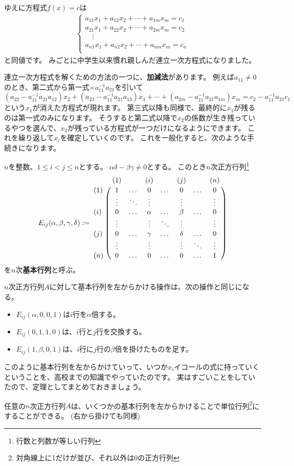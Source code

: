 ゆえに方程式$f(x)=c$は
\begin{align*}
  \begin{cases}
    a_{11}x_1+a_{12}x_2+\cdots+a_{1m}x_m=c_1\\
    a_{21}x_1+a_{22}x_2+\cdots+a_{2m}x_m=c_2\\
    \quad\vdots\\
    a_{n1}x_1+a_{n2}x_2+\cdots+a_{nm}x_m=c_n\\
  \end{cases}
\end{align*}
と同値です。
みごとに中学生以来慣れ親しんだ連立一次方程式になりました。

連立一次方程式を解くための方法の一つに、\textbf{加減法}があります。
例えば$a_{11}\neq0$のとき、第二式から第一式$\times a_{11}^{-1}a_{21}$を引いて
\[
  (a_{22}-a_{11}^{-1}a_{21}a_{12})x_2+(a_{23}-a_{11}^{-1}a_{21}a_{13})x_3+\cdots+(a_{2m}-a_{11}^{-1}a_{21}a_{1m})x_m=c_2-a_{11}^{-1}a_{21}c_1
\]
という$x_1$が消えた方程式が現れます。
第三式以降も同様で、最終的に$x_1$が残るのは第一式のみになります。
そうすると第二式以降で$x_2$の係数が生き残っているやつを選んで、$x_2$が残っている方程式が一つだけになるようにできます。
これを繰り返して$x_i$を確定していくのです。
これを一般化すると、次のような手続きになります。
\begin{definition}
  $n$を整数、$1\leq i<j\leq n$とする。
  $\alpha\delta-\beta\gamma\neq0$とする。
  このとき$n$次正方行列\footnote{行数と列数が等しい行列}
  \[
    E_{ij}(\alpha, \beta, \gamma, \delta) :=
    \bordermatrix{
             & (1)    &   & (i)    &   & (j)    &   & (n)    \cr
        (1)  & 1      & \dots  & 0      & \dots  & 0      & \dots  & 0      \cr
         & \vdots & \ddots & \vdots &        & \vdots &        & \vdots \cr
        (i)  & 0      & \dots  & \alpha & \dots  & \beta  & \dots  & 0      \cr
         & \vdots &        & \vdots & \ddots & \vdots &        & \vdots \cr
        (j)  & 0      & \dots  & \gamma & \dots  & \delta & \dots  & 0      \cr
         & \vdots &        & \vdots &        & \vdots & \ddots & \vdots \cr
        (n)  & 0      & \dots  & 0      & \dots  & 0      & \dots  & 1      \cr
    }
  \]
  を$n$次\textbf{基本行列}と呼ぶ。
\end{definition}
\begin{example}
  $n$次正方行列$A$に対して基本行列を左からかける操作は、次の操作と同じになる。
  \begin{itemize}
    \item $E_{ij}(\alpha,0,0,1)$は$i$行を$\alpha$倍する。
    \item $E_{ij}(0,1,1,0)$は、$i$行と$j$行を交換する。
    \item $E_{ij}(1,\beta,0,1)$は、$i$行に$j$行の$\beta$倍を掛けたものを足す。
  \end{itemize}
\end{example}
このように基本行列を左からかけていって、いつか$x_i$イコールの式に持っていくということを、高校までの知識でやっていたのです。
実はすごいことをしていたので、定理としてまとめておきましょう。
\begin{theorem}
  任意の$n$次正方行列$A$は、いくつかの基本行列を左からかけることで単位行列\footnote{対角線上に1だけが並び、それ以外は0の正方行列}にすることができる。
  (右から掛けても同様)
\end{theorem}

